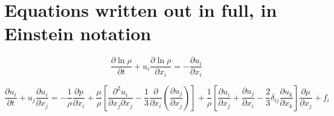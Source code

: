 \documentclass[notitlepage]{revtex4-1}
\begin{document}
\appendix
\section{Equations written out in full, in Einstein notation}\label{fulleqns}

\begin{equation}\frac{\partial\ln\rho}{\partial{t}}+u_{i}\frac{\partial\ln\rho}{\partial{x}_{i}}=-\frac{\partial{u}_{i}}{\partial{x}_{i}}\end{equation}

\begin{equation}\frac{\partial{u}_{i}}{\partial{t}}+u_{j}\frac{\partial{u}_{i}}{\partial{x}_{j}}=-\frac{1}{\rho}\frac{\partial{p}}{\partial{x}_{i}}+\frac{\mu}{\rho}\left[\frac{\partial^{2}u_{i}}{\partial{x}_{j}\partial{x}_{j}}-\frac{1}{3}\frac{\partial}{\partial{x}_{i}}\left(\frac{\partial{u}_{j}}{\partial{x}_{j}}\right)\right]+\frac{1}{\rho}\left[\frac{\partial{u}_{i}}{\partial{x}_{j}}+\frac{\partial{u}_{j}}{\partial{x}_{i}}-\frac{2}{3}\delta_{ij}\frac{\partial{u}_{k}}{\partial{x}_{k}}\right]\frac{\partial\mu}{\partial{x}_{j}}+f_{i}\end{equation}
\end{document}
